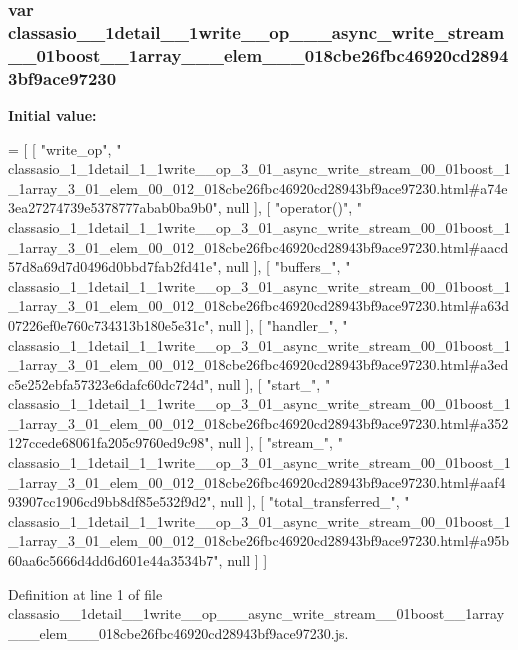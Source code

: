 \subsubsection[{classasio\+\_\+1\+\_\+1detail\+\_\+1\+\_\+1write\+\_\+\+\_\+op\+\_\+3\+\_\+01\+\_\+async\+\_\+write\+\_\+stream\+\_\+00\+\_\+01boost\+\_\+1\+\_\+1array\+\_\+3\+\_\+01\+\_\+elem\+\_\+00\+\_\+012\+\_\+018cbe26fbc46920cd28943bf9ace97230}]{\setlength{\rightskip}{0pt plus 5cm}var classasio\+\_\+\_\+1detail\+\_\+\_\+1write\+\_\+\+\_\+op\+\_\+\_\+\_\+async\+\_\+write\+\_\+stream\+\_\+\_\+01boost\+\_\+\_\+1array\+\_\+\_\+\_\+elem\+\_\+\_\+\_\+018cbe26fbc46920cd28943bf9ace97230}\label{classasio__1__1detail__1__1write____op__3__01__async__write__stream__00__01boost__1__1array__3__74a0e266dbec84005e1ff5344d6adfde_aa62f417527082ec240f5ef9faa6b9c80}
{\bfseries Initial value\+:}
\begin{DoxyCode}
=
[
    [ \textcolor{stringliteral}{"write\_op"}, \textcolor{stringliteral}{"
      classasio\_1\_1detail\_1\_1write\_\_op\_3\_01\_async\_write\_stream\_00\_01boost\_1\_1array\_3\_01\_elem\_00\_012\_018cbe26fbc46920cd28943bf9ace97230.html#a74e3ea27274739e5378777abab0ba9b0"}, null ],
    [ \textcolor{stringliteral}{"operator()"}, \textcolor{stringliteral}{"
      classasio\_1\_1detail\_1\_1write\_\_op\_3\_01\_async\_write\_stream\_00\_01boost\_1\_1array\_3\_01\_elem\_00\_012\_018cbe26fbc46920cd28943bf9ace97230.html#aacd57d8a69d7d0496d0bbd7fab2fd41e"}, null ],
    [ \textcolor{stringliteral}{"buffers\_"}, \textcolor{stringliteral}{"
      classasio\_1\_1detail\_1\_1write\_\_op\_3\_01\_async\_write\_stream\_00\_01boost\_1\_1array\_3\_01\_elem\_00\_012\_018cbe26fbc46920cd28943bf9ace97230.html#a63d07226ef0e760c734313b180e5e31c"}, null ],
    [ \textcolor{stringliteral}{"handler\_"}, \textcolor{stringliteral}{"
      classasio\_1\_1detail\_1\_1write\_\_op\_3\_01\_async\_write\_stream\_00\_01boost\_1\_1array\_3\_01\_elem\_00\_012\_018cbe26fbc46920cd28943bf9ace97230.html#a3edc5e252ebfa57323e6dafc60dc724d"}, null ],
    [ \textcolor{stringliteral}{"start\_"}, \textcolor{stringliteral}{"
      classasio\_1\_1detail\_1\_1write\_\_op\_3\_01\_async\_write\_stream\_00\_01boost\_1\_1array\_3\_01\_elem\_00\_012\_018cbe26fbc46920cd28943bf9ace97230.html#a352127ccede68061fa205c9760ed9c98"}, null ],
    [ \textcolor{stringliteral}{"stream\_"}, \textcolor{stringliteral}{"
      classasio\_1\_1detail\_1\_1write\_\_op\_3\_01\_async\_write\_stream\_00\_01boost\_1\_1array\_3\_01\_elem\_00\_012\_018cbe26fbc46920cd28943bf9ace97230.html#aaf493907cc1906cd9bb8df85e532f9d2"}, null ],
    [ \textcolor{stringliteral}{"total\_transferred\_"}, \textcolor{stringliteral}{"
      classasio\_1\_1detail\_1\_1write\_\_op\_3\_01\_async\_write\_stream\_00\_01boost\_1\_1array\_3\_01\_elem\_00\_012\_018cbe26fbc46920cd28943bf9ace97230.html#a95b60aa6c5666d4dd6d601e44a3534b7"}, null ]
]
\end{DoxyCode}


Definition at line 1 of file classasio\+\_\+\_\+1detail\+\_\+\_\+1write\+\_\+\+\_\+op\+\_\+\_\+\_\+async\+\_\+write\+\_\+stream\+\_\+\_\+01boost\+\_\+\_\+1array\+\_\+\_\+\_\+elem\+\_\+\_\+\_\+018cbe26fbc46920cd28943bf9ace97230.\+js.

